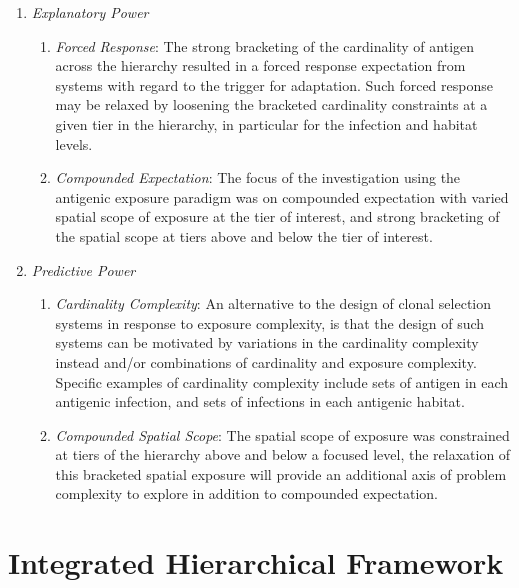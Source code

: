 \begin{enumerate}
	\item \emph{Explanatory Power}
	\begin{enumerate}
		\item \emph{Forced Response}: The strong bracketing of the cardinality of antigen across the hierarchy resulted in a forced response expectation from systems with regard to the trigger for adaptation. Such forced response may be relaxed by loosening the bracketed cardinality constraints at a given tier in the hierarchy, in particular for the infection and habitat levels.
		\item \emph{Compounded Expectation}: The focus of the investigation using the antigenic exposure paradigm was on compounded expectation with varied spatial scope of exposure at the tier of interest, and strong bracketing of the spatial scope at tiers above and below the tier of interest.
	\end{enumerate}

	\item \emph{Predictive Power}
	\begin{enumerate}
		\item \emph{Cardinality Complexity}: An alternative to the design of clonal selection systems in response to exposure complexity, is that the design of such systems can be motivated by variations in the cardinality complexity instead and/or combinations of cardinality and exposure complexity. Specific examples of cardinality complexity include sets of antigen in each antigenic infection, and sets of infections in each antigenic habitat.
		\item \emph{Compounded Spatial Scope}: The spatial scope of exposure was constrained at tiers of the hierarchy above and below a focused level, the relaxation of this bracketed spatial exposure will provide an additional axis of problem complexity to explore in addition to compounded expectation.		
	\end{enumerate}	
\end{enumerate}


%
%
\section{Integrated Hierarchical Framework}
\label{sec:framework:ihcsf}

%
%
